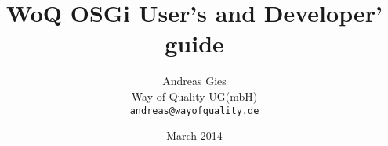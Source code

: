 \documentclass[11pt,a4paper,draft,titlepage,oneside,twoside]{report}
\title{WoQ OSGi User's and Developer' guide}
\author{Andreas Gies\\
  Way of Quality UG(mbH)\\
  \texttt{andreas@wayofquality.de}}
\date{March 2014}
\begin{document}
\maketitle
\renewcommand{\abstractname}{Executive Summary}
\begin{abstract}
\end{abstract}
\end{document}

